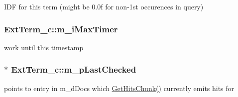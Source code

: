 I\-D\-F for this term (might be 0.\-0f for non-\/1st occurences in query) 

\hypertarget{classExtTerm__c_ad1e0d11291cc5c27fe6a49c6f4a8e4a2}{
\subsubsection[{m\-\_\-i\-Max\-Timer}]{ Ext\-Term\-\_\-c\-::m\-\_\-i\-Max\-Timer\hspace{0.3cm}{\ttfamily [protected]}}}\label{classExtTerm__c_ad1e0d11291cc5c27fe6a49c6f4a8e4a2}


work until this timestamp 

\hypertarget{classExtTerm__c_a8af4c8bf1750fda58c1f6712655ee2c3}{
\subsubsection[{m\-\_\-p\-Last\-Checked}]{$\ast$ Ext\-Term\-\_\-c\-::m\-\_\-p\-Last\-Checked\hspace{0.3cm}{\ttfamily [protected]}}}\label{classExtTerm__c_a8af4c8bf1750fda58c1f6712655ee2c3}


points to entry in m\-\_\-d\-Docs which \hyperlink{classExtTerm__c_a0ab91a1da71996bea098ab1b757d0d3c}{Get\-Hits\-Chunk()} currently emits hits for 

